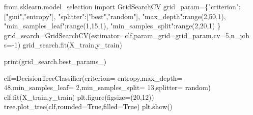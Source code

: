 \documentclass[
  letterpaper,
  DIV=11,
  numbers=noendperiod]{scrartcl}
\newenvironment{Shaded}{\begin{snugshade}}{\end{snugshade}}
\newcommand{\BuiltInTok}[1]{\textcolor[rgb]{0.00,0.23,0.31}{#1}}
\newcommand{\DecValTok}[1]{\textcolor[rgb]{0.68,0.00,0.00}{#1}}
\newcommand{\ImportTok}[1]{\textcolor[rgb]{0.00,0.46,0.62}{#1}}
\newcommand{\NormalTok}[1]{\textcolor[rgb]{0.00,0.23,0.31}{#1}}
\newcommand{\OperatorTok}[1]{\textcolor[rgb]{0.37,0.37,0.37}{#1}}
\newcommand{\StringTok}[1]{\textcolor[rgb]{0.13,0.47,0.30}{#1}}
\newcommand{\VariableTok}[1]{\textcolor[rgb]{0.07,0.07,0.07}{#1}}
\begin{document}
\begin{Shaded}
\begin{Highlighting}[]
\ImportTok{from}\NormalTok{ sklearn.model\_selection }\ImportTok{import}\NormalTok{ GridSearchCV}
\NormalTok{grid\_param}\OperatorTok{=}\NormalTok{\{}\StringTok{"criterion"}\NormalTok{:[}\StringTok{"gini"}\NormalTok{,}\StringTok{"entropy"}\NormalTok{],}
             \StringTok{"splitter"}\NormalTok{:[}\StringTok{"best"}\NormalTok{,}\StringTok{"random"}\NormalTok{],}
             \StringTok{"max\_depth"}\NormalTok{:}\BuiltInTok{range}\NormalTok{(}\DecValTok{2}\NormalTok{,}\DecValTok{50}\NormalTok{,}\DecValTok{1}\NormalTok{),}
             \StringTok{"min\_samples\_leaf"}\NormalTok{:}\BuiltInTok{range}\NormalTok{(}\DecValTok{1}\NormalTok{,}\DecValTok{15}\NormalTok{,}\DecValTok{1}\NormalTok{),}
             \StringTok{"min\_samples\_split"}\NormalTok{:}\BuiltInTok{range}\NormalTok{(}\DecValTok{2}\NormalTok{,}\DecValTok{20}\NormalTok{,}\DecValTok{1}\NormalTok{) }
\NormalTok{            \}}
\NormalTok{grid\_search}\OperatorTok{=}\NormalTok{GridSearchCV(estimator}\OperatorTok{=}\NormalTok{clf,param\_grid}\OperatorTok{=}\NormalTok{grid\_param,cv}\OperatorTok{=}\DecValTok{5}\NormalTok{,n\_jobs}\OperatorTok{={-}}\DecValTok{1}\NormalTok{)}
\NormalTok{grid\_search.fit(X\_train,y\_train)}
\end{Highlighting}
\end{Shaded}

\begin{Shaded}
\begin{Highlighting}[]
\BuiltInTok{print}\NormalTok{(grid\_search.best\_params\_)}
\end{Highlighting}
\end{Shaded}

\begin{Shaded}
\begin{Highlighting}[]
\NormalTok{clf}\OperatorTok{=}\NormalTok{DecisionTreeClassifier(criterion}\OperatorTok{=} \StringTok{\textquotesingle{}entropy\textquotesingle{}}\NormalTok{,max\_depth}\OperatorTok{=} \DecValTok{48}\NormalTok{,min\_samples\_leaf}\OperatorTok{=} \DecValTok{2}\NormalTok{,min\_samples\_split}\OperatorTok{=} \DecValTok{13}\NormalTok{,splitter}\OperatorTok{=} \StringTok{\textquotesingle{}random\textquotesingle{}}\NormalTok{)}
\NormalTok{clf.fit(X\_train,y\_train)}
\NormalTok{plt.figure(figsize}\OperatorTok{=}\NormalTok{(}\DecValTok{20}\NormalTok{,}\DecValTok{12}\NormalTok{))}
\NormalTok{tree.plot\_tree(clf,rounded}\OperatorTok{=}\VariableTok{True}\NormalTok{,filled}\OperatorTok{=}\VariableTok{True}\NormalTok{)}
\NormalTok{plt.show()}
\end{Highlighting}
\end{Shaded}
\end{document}
